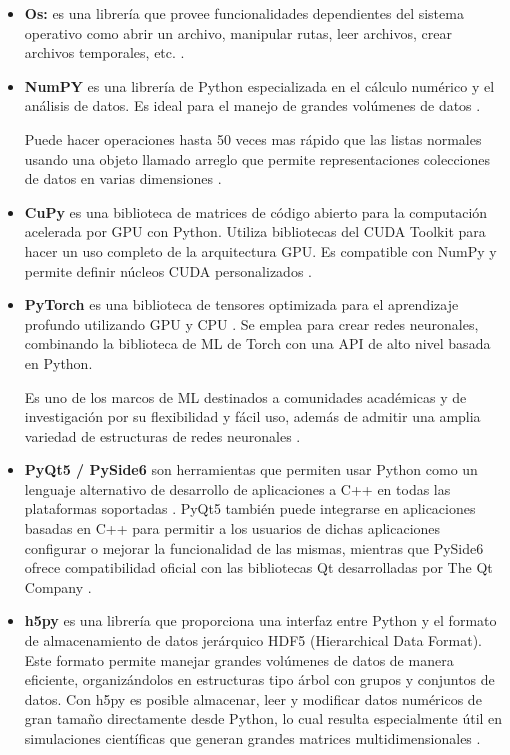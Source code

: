 \begin{itemize}
	
	\item \textbf{Os:}
	es una librería que provee funcionalidades dependientes del sistema operativo como abrir un archivo, manipular rutas, leer archivos, crear archivos temporales, etc. \cite{pythonOS}.
	
	\item\textbf{NumPY} es una librería de Python especializada en el cálculo numérico y el análisis de datos. Es ideal para el manejo de grandes volúmenes de datos \cite{alfaro_numpy}.
	
	Puede hacer operaciones hasta 50 veces mas rápido que las listas normales usando una objeto llamado arreglo que permite representaciones colecciones de datos en varias dimensiones \cite{alfaro_numpy}.
	
	\item \textbf{CuPy} es una biblioteca de matrices de código abierto para la computación acelerada por GPU con Python. Utiliza bibliotecas del CUDA Toolkit para hacer un uso completo de la arquitectura GPU. Es compatible con NumPy y permite definir núcleos CUDA personalizados \cite{cupy}. 
	
	\item\textbf{PyTorch} es una biblioteca de tensores optimizada para el aprendizaje profundo utilizando GPU y CPU \cite{pytorch_1}. Se emplea para crear redes neuronales, combinando la biblioteca de ML de Torch con una API de alto nivel basada en Python. 
	
	Es uno de los marcos de ML destinados a comunidades académicas y de investigación por su flexibilidad y fácil uso, además de admitir una amplia variedad de estructuras de redes neuronales \cite{pytorch_2}.
	
	\item \textbf{PyQt5 / PySide6} son herramientas que permiten usar Python como un lenguaje alternativo de desarrollo de aplicaciones a C++ en todas las plataformas soportadas \cite{qt_1}. PyQt5 también puede integrarse en aplicaciones basadas en C++ para permitir a los usuarios de dichas aplicaciones configurar o mejorar la funcionalidad de las mismas, mientras que PySide6 ofrece compatibilidad oficial con las bibliotecas Qt desarrolladas por The Qt Company \cite{qt_2}.
	
	\item \textbf{h5py} es una librería que proporciona una interfaz entre Python y el formato de almacenamiento de datos jerárquico HDF5 (Hierarchical Data Format). Este formato permite manejar grandes volúmenes de datos de manera eficiente, organizándolos en estructuras tipo árbol con grupos y conjuntos de datos. Con h5py es posible almacenar, leer y modificar datos numéricos de gran tamaño directamente desde Python, lo cual resulta especialmente útil en simulaciones científicas que generan grandes matrices multidimensionales \cite{h5py}.
	

\end{itemize}
